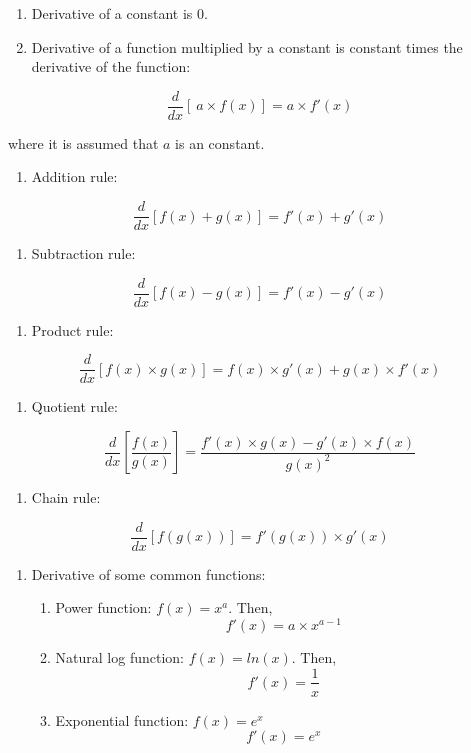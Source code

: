 \documentclass[]{book}
\providecommand{\tightlist}{%
  \setlength{\itemsep}{0pt}\setlength{\parskip}{0pt}}
\theoremstyle{definition}
\theoremstyle{definition}
\theoremstyle{definition}
\theoremstyle{remark}
\begin{document}
\begin{enumerate}
\def\labelenumi{\arabic{enumi}.}
\item
  Derivative of a constant is \(0\).
\item
  Derivative of a function multiplied by a constant is constant times the derivative of the function:
\end{enumerate}

\[\frac{d}{dx} [\ a\times f(x)]=a\times f'(x)\]

where it is assumed that \(a\) is an constant.

\begin{enumerate}
\def\labelenumi{\arabic{enumi}.}
\setcounter{enumi}{2}
\tightlist
\item
  Addition rule:
\end{enumerate}

\[ \frac{d}{dx} [f(x)+ g(x)]=f'(x)+ g'(x) \]

\begin{enumerate}
\def\labelenumi{\arabic{enumi}.}
\setcounter{enumi}{3}
\tightlist
\item
  Subtraction rule:
\end{enumerate}

\[ \frac{d}{dx} [f(x)- g(x)]=f'(x)-g'(x) \]

\begin{enumerate}
\def\labelenumi{\arabic{enumi}.}
\setcounter{enumi}{4}
\tightlist
\item
  Product rule:
\end{enumerate}

\[ \frac{d}{dx} [f(x)\times g(x)]= f(x) \times g'(x) + g(x)\times f'(x)\]

\begin{enumerate}
\def\labelenumi{\arabic{enumi}.}
\setcounter{enumi}{5}
\tightlist
\item
  Quotient rule:
\end{enumerate}

\[ \frac{d}{dx} \left[\frac{f(x)}{g(x)}\right]=\frac{f'(x) \times g(x) - g'(x) \times f(x)}{g(x)^2}\]

\begin{enumerate}
\def\labelenumi{\arabic{enumi}.}
\setcounter{enumi}{6}
\tightlist
\item
  Chain rule:
\end{enumerate}

\[ \frac{d}{dx} [f(g(x))] = f'(g(x)) \times g'(x)\]

\begin{enumerate}
\def\labelenumi{\arabic{enumi}.}
\setcounter{enumi}{7}
\item
  Derivative of some common functions:

  \begin{enumerate}
  \def\labelenumii{\alph{enumii}.}
  \item
    Power function: \(f(x)=x^a\). Then,
    \[f'(x)=a \times x^{a-1}\]
  \item
    Natural log function: \(f(x)=ln(x)\). Then,
    \[f'(x) = \frac{1}{x}\]
  \item
    Exponential function: \(f(x)=e^x\)
    \[f'(x)=e^x\]
  \end{enumerate}
\end{enumerate}
\end{document}
